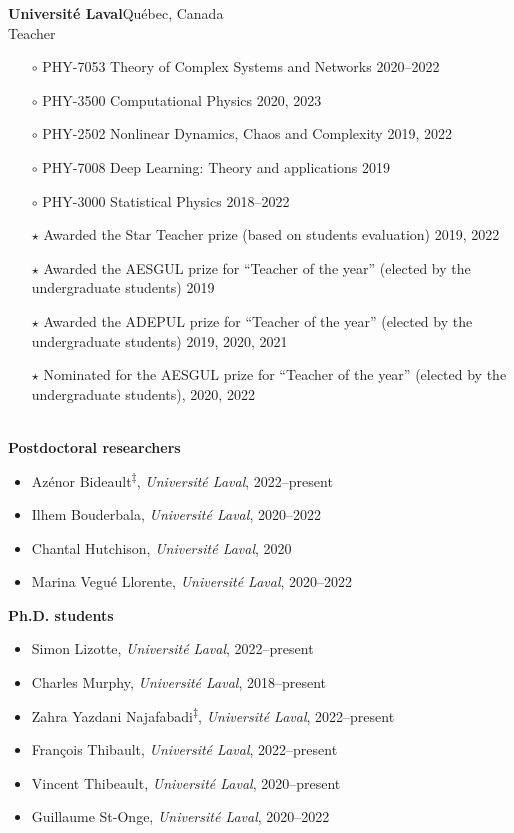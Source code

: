 \documentclass[11pt]{article}
\newcommand{\TitreSection}[1]{\colorbox{background}{\makebox[\textwidth-0.5em][c]{\Large\textrm{\textsc{#1}}}}\vspace{0.75\baselineskip}\\}
\begin{document}
%
\textbf{Universit\'e Laval}\hfill Qu\'ebec, Canada\\
Teacher
\begin{itemize}[leftmargin=1.5em]\small
  \item[$\circ$] PHY-7053 Theory of Complex Systems and Networks \hfill 2020--2022%
  \item[$\circ$] PHY-3500 Computational Physics \hfill 2020, 2023%
  \item[$\circ$] PHY-2502 Nonlinear Dynamics, Chaos and Complexity \hfill 2019, 2022%
  \item[$\circ$] PHY-7008 Deep Learning: Theory and applications \hfill 2019%
  \item[$\circ$] PHY-3000 Statistical Physics \hfill 2018--2022%
  \item[$\star$] Awarded the Star Teacher prize (based on students evaluation) 2019, 2022
  \item[$\star$] Awarded the AESGUL prize for ``Teacher of the year'' (elected by the undergraduate students) 2019
  \item[$\star$] Awarded the ADEPUL prize for ``Teacher of the year'' (elected by the undergraduate students) 2019, 2020, 2021
  \item[$\star$] Nominated for the AESGUL prize for ``Teacher of the year'' (elected by the undergraduate students), 2020, 2022
\end{itemize} \vspace{0.75\baselineskip}
%
%
%
%
%
\TitreSection{Mentoring\footnotemark}
%
%
\textbf{Postdoctoral researchers}
%
\begin{itemize}
  \item Azénor Bideault\textsuperscript{$\ddagger$}, \textit{Universit\'e Laval}, 2022--present
  \item Ilhem Bouderbala, \textit{Universit\'e Laval}, 2020--2022
  \item Chantal Hutchison, \textit{Université Laval}, 2020
  \item Marina Vegué Llorente, \textit{Université Laval}, 2020--2022
\end{itemize}
%
%
%
\textbf{Ph.D. students}
%
\begin{itemize}
  \item Simon Lizotte, \textit{Universit\'e Laval}, 2022--present
  \item Charles Murphy, \textit{Universit\'e Laval}, 2018--present
  \item Zahra Yazdani Najafabadi\textsuperscript{$\ddagger$}, \textit{Université Laval}, 2022--present
  \item Fran\c{c}ois Thibault, \textit{Universit\'e Laval}, 2022--present
  \item Vincent Thibeault, \textit{Université Laval}, 2020--present
  \item Guillaume St-Onge, \textit{Université Laval}, 2020--2022 \href{http://hdl.handle.net/20.500.11794/72971}{}
\end{itemize}
\end{document}
